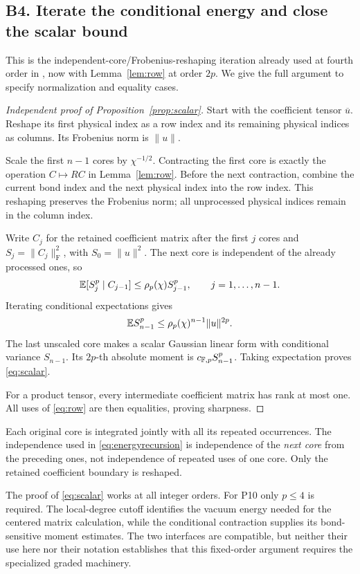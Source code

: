 \documentclass[11pt]{article}
\numberwithin{equation}{section}
\theoremstyle{definition}\newtheorem{definition}[theorem]{Definition}
\theoremstyle{remark}\newtheorem{remark}[theorem]{Remark}
\newcommand{\norm}[1]{\lVert#1\rVert}\newcommand{\ip}[2]{\langle#1,#2\rangle}
\begin{document}
\subsection{B4. Iterate the conditional energy and close the scalar bound}
This is the independent-core/Frobenius-reshaping iteration already used at
fourth order in \cite[Section~5.1]{RR2020}, now with Lemma~\ref{lem:row} at order
$2p$. We give the full argument to specify normalization and equality cases.
\begin{proof}[Independent proof of Proposition~\ref{prop:scalar}]
Start with the coefficient tensor $\overline u$. Reshape its first physical
index as a row index and its remaining physical indices as columns. Its
Frobenius norm is $\norm u$.

Scale the first $n-1$ cores by $\chi^{-1/2}$. Contracting the first core is
exactly the operation $C\mapsto RC$ in Lemma~\ref{lem:row}. Before the next
contraction, combine the current bond index and the next physical index into
the row index. This reshaping preserves the Frobenius norm; all unprocessed
physical indices remain in the column index.

Write $C_j$ for the retained coefficient matrix after the first $j$ cores
and $S_j=\norm{C_j}_{\mathrm F}^2$, with $S_0=\norm u^2$.
The next core is independent of the already processed ones, so
\begin{equation}\label{eq:energyrecursion}
 \mathbb E[S_j^p\mid C_{j-1}]\le\rho_p(\chi)S_{j-1}^p,
 \qquad j=1,\ldots,n-1.
\end{equation}
Iterating conditional expectations gives
\[
 \E S_{n-1}^p\le\rho_p(\chi)^{n-1}\norm u^{2p}.
\]
The last unscaled core makes a scalar Gaussian linear form with conditional
variance $S_{n-1}$. Its $2p$-th absolute moment is $c_{\mathbb F,p}S_{n-1}^p$.
Taking expectation proves \eqref{eq:scalar}.

For a product tensor, every intermediate coefficient matrix has rank at most
one. All uses of \eqref{eq:row} are then equalities, proving sharpness.
\end{proof}

Each original core is integrated jointly with all its repeated occurrences.
The independence used in \eqref{eq:energyrecursion} is independence of the
\emph{next core} from the preceding ones, not independence of repeated uses
of one core. Only the retained coefficient boundary is reshaped.

The proof of \eqref{eq:scalar} works at all integer orders. For P10 only
$p\le4$ is required. The local-degree cutoff identifies the vacuum energy
needed for the centered matrix calculation, while the conditional contraction
supplies its bond-sensitive moment estimates. The two interfaces are
compatible, but neither their use here nor their notation establishes that
this fixed-order argument requires the specialized graded machinery.
\end{document}
